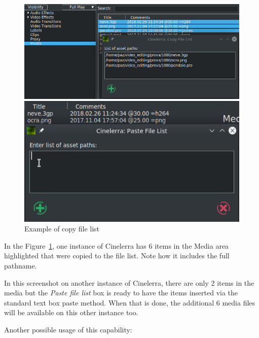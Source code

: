 \begin{figure}[htpb]
    \centering
    \begin{minipage}{.49\linewidth}
    \centering
        \includegraphics[width=0.99\linewidth]{images/copy_files1.png}
    \end{minipage}
    \hfill
    \begin{minipage}{.49\linewidth}
    \centering
        \includegraphics[width=0.99\linewidth]{images/copy_files2.png}
    \end{minipage}
    \caption{Example of copy file list}
    \label{fig:copy_files1}
\end{figure}

In the Figure~\ref{fig:copy_files1}, one instance of Cinelerra has 6 items in the Media area highlighted that were copied to the file list.  
Note how it includes the full pathname.

In this screenshot on another instance of Cinelerra, there are only 2 items in the media but the \textit{Paste file list} box is ready to have the items inserted via the standard text box paste method.  When that is done, the additional 6 media files will be available on this other instance too.


Another possible usage of this capability:

